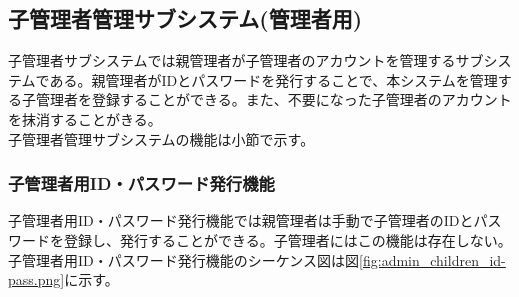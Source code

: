 \documentclass[a4j]{jarticle}
\begin{document}
  \subsection{子管理者管理サブシステム(管理者用)}
  子管理者サブシステムでは親管理者が子管理者のアカウントを管理するサブシステムである。親管理者がIDとパスワードを発行することで、本システムを管理する子管理者を登録することができる。また、不要になった子管理者のアカウントを抹消することがきる。\\
  子管理者管理サブシステムの機能は小節で示す。
  \subsubsection{子管理者用ID・パスワード発行機能}
  子管理者用ID・パスワード発行機能では親管理者は手動で子管理者のIDとパスワードを登録し、発行することができる。子管理者にはこの機能は存在しない。子管理者用ID・パスワード発行機能のシーケンス図は図\ref{fig:admin_children_id-pass.png}に示す。
\end{document}

